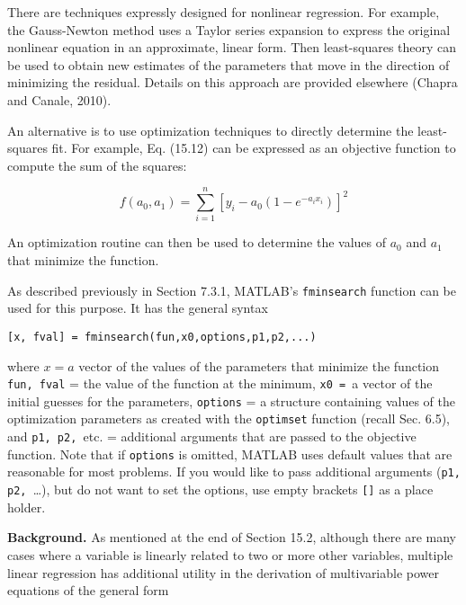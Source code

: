 \documentclass[../main.tex]{subfiles}
\begin{document}
There are techniques expressly designed for nonlinear regression. For example, the
Gauss-Newton method uses a Taylor series expansion to express the original nonlinear
equation in an approximate, linear form. Then least-squares theory can be used to obtain
new estimates of the parameters that move in the direction of minimizing the residual.
Details on this approach are provided elsewhere (Chapra and Canale, 2010).

An alternative is to use optimization techniques to directly determine the least-squares
fit. For example, Eq. (15.12) can be expressed as an objective function to compute the sum
of the squares:

\begin{equation}
	\tag{15.13}
	f(a_0, a_1) = \sum^n_{i=1} {[y_i - a_0 (1 - e ^ {-a_i x_i})]} ^ 2
\end{equation}

An optimization routine can then be used to determine the values of $a_0$ and $a_1$ that minimize the function.

As described previously in Section 7.3.1, MATLAB's \texttt{fminsearch} function can be used for this purpose. It has the general syntax

\begin{lstlisting}[numbers=none] 
	[x, fval] = fminsearch(fun,x0,options,p1,p2,...)
\end{lstlisting}

\noindent where $x = a$ vector of the values of the parameters that minimize the function \texttt{fun, fval} = the value of the function at the minimum, \texttt{x0 = }a vector of the initial guesses for the parameters, \texttt{options} = a structure containing values of the optimization parameters as created with the \texttt{optimset} function (recall Sec. 6.5), and \texttt{p1, p2, }etc. = additional arguments that are passed to the objective function. 
Note that if \texttt{options} is omitted, MATLAB uses default values that are reasonable for most problems. If you would like to pass additional arguments (\texttt{p1, p2, }\dots), but do not want to set the options, use empty brackets \texttt{[]} as a place holder.


\noindent\textbf{Background.} \quad As mentioned at the end of Section 15.2, although there are many cases where a variable is linearly related to two or more other variables, multiple linear regression has additional utility in the derivation of multivariable power equations of the general form
\end{document}
